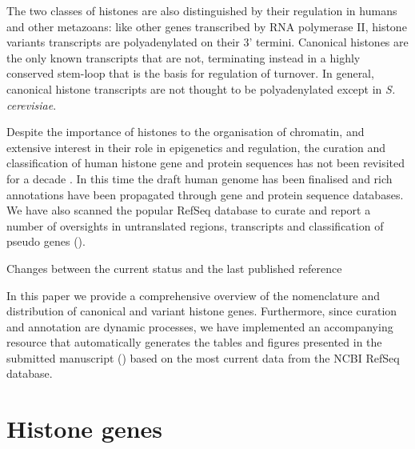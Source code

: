 \documentclass[10pt,a4paper,twocolumn,article]{memoir}
\begin{document}
    The two classes of histones are also distinguished by their regulation in humans and other
    metazoans: like other genes transcribed by RNA polymerase II,  histone variants transcripts
    are polyadenylated on their 3' termini. Canonical histones are the only known transcripts
    that are not, terminating instead in a highly conserved stem-loop that is the basis for
    regulation of turnover. In general, canonical histone transcripts are not thought to be
    polyadenylated except in \textit{S. cerevisiae}.

    Despite the importance of histones to the organisation of chromatin, and extensive interest
    in their role in epigenetics and regulation, the curation and classification of human histone
    gene and protein sequences has not been revisited for a decade \cite{Marzluff02}. In this time
    the draft human genome has been finalised and rich annotations have been propagated through
    gene and protein sequence databases. We have also scanned the popular RefSeq
    database to curate and report a number of oversights in untranslated regions, transcripts and
    classification of pseudo genes ().


    \begin{table}
      \caption{Changes between the current status and the last published reference \cite{Marzluff02}}
      \label{tab:difference-from-Marzluff02}
      \centering
      
    \end{table}

    In this paper we provide a comprehensive overview of the nomenclature and distribution
    of canonical and variant histone genes. Furthermore, since curation and annotation are
    dynamic processes, we have implemented an accompanying resource that automatically generates
    the tables and figures presented in the submitted manuscript () based
    on the most current data from the NCBI RefSeq database.

  \section{Histone genes}
\end{document}
